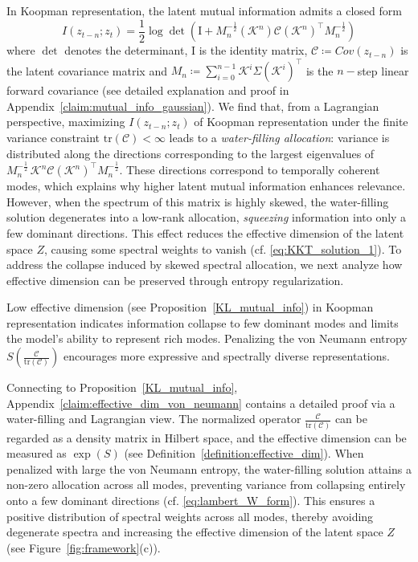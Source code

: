 \documentclass{article} %
\begin{document}
In Koopman representation, the latent mutual information admits a closed form 
\begin{equation} \label{eq:closed_form_latent_mutual_info}
    I(z_{t-n}; z_{t}) = \frac{1}{2} \log \det(\mathrm{I} + M_n^{-\frac{1}{2}}(\mathcal{K}^{n})\mathcal{C}(\mathcal{K}^{n})^{\top}M_n^{-\frac{1}{2}})
\end{equation}
where $\det$ denotes the determinant, $\mathrm{I}$ is the identity matrix, $\mathcal{C} \coloneqq Cov(z_{t-n})$ is the latent covariance matrix and $M_n \coloneqq \sum_{i = 0}^{n-1}  \mathcal{K}^{i} \Sigma (\mathcal{K}^{i})^{\top}$ is the $n-$step linear forward covariance (see detailed explanation and proof in Appendix~\ref{claim:mutual_info_gaussian}). We find that, from a Lagrangian perspective, maximizing $I(z_{t-n}; z_t)$ of Koopman representation under the finite variance constraint $\mathrm{tr}(\mathcal{C}) < \infty$ leads to a \emph{water-filling allocation}: variance is distributed along the directions corresponding to the largest eigenvalues of $M_n^{-\tfrac{1}{2}}\, \mathcal{K}^{n}\mathcal{C}(\mathcal{K}^{n})^{\!\top} M_n^{-\tfrac{1}{2}}$. 
These directions correspond to temporally coherent modes, which explains why higher latent mutual information enhances relevance. However, when the spectrum of this matrix is highly skewed, the water-filling solution degenerates into a low-rank allocation, \emph{squeezing} information into only a few dominant directions. This effect reduces the effective dimension of the latent space $Z$, causing some spectral weights to vanish (cf. \eqref{eq:KKT_solution_1}). To address the collapse induced by skewed spectral allocation, we next analyze how effective dimension can be preserved through entropy regularization.

\begin{claimwithframe}\label{claim:effective_dim}
Low effective dimension (see Proposition~\ref{KL_mutual_info}) in Koopman representation indicates information collapse to few dominant modes and limits the model’s ability to represent rich modes. Penalizing the von Neumann entropy $S(\frac{\mathcal{C}}{\mathrm{tr}(\mathcal{C})})$ encourages more expressive and spectrally diverse representations.
\end{claimwithframe}
Connecting to Proposition~\ref{KL_mutual_info}, Appendix~\ref{claim:effective_dim_von_neumann} contains a detailed proof via a water-filling and Lagrangian view. The normalized operator $\frac{\mathcal{C}}{\mathrm{tr}(\mathcal{C})}$ can be regarded as a density matrix in Hilbert space, and the effective dimension can be measured as $\exp(S)$ (see Definition~\ref{definition:effective_dim}). When penalized with large the von Neumann entropy, the water-filling solution attains a non-zero allocation across all modes, preventing variance from collapsing entirely onto a few dominant directions (cf. \eqref{eq:lambert_W_form}). This ensures a positive distribution of spectral weights across all modes, thereby avoiding degenerate spectra and increasing the effective dimension of the latent space $Z$ (see Figure~\ref{fig:framework}(c)). 
\end{document}
